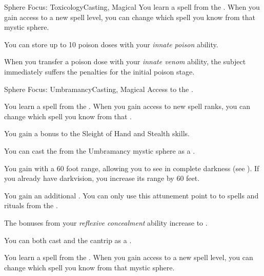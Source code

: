 \begin{feat}{Sphere Focus: Toxicology}{Casting, Magical}
         You learn a spell from the  .
        When you gain access to a new spell level, you can change which spell you know from that mystic sphere.

         You can store up to 10 poison doses with your \textit{innate poison} ability.

         When you transfer a poison dose with your \textit{innate venom} ability, the subject immediately suffers the penalties for the initial poison stage.
    \end{feat}

    \begin{feat}{Sphere Focus: Umbramancy}{Casting, Magical}
        \featpre Access to the  .

         You learn a spell from the  .
        When you gain access to new spell ranks, you can change which spell you know from that .

         You gain a  bonus to the Sleight of Hand and Stealth skills.

         You can cast the   from the Umbramancy mystic sphere as a .

         You gain  with a 60 foot range, allowing you to see in complete darkness (see ).
        If you already have darkvision, you increase its range by 60 feet.

         You gain an additional .
        You can only use this attunement point to  to spells and rituals from the  .

         The bonuses from your \textit{reflexive concealment} ability increase to .

         You can both cast and  the  cantrip as a .

         You learn a spell from the  .
        When you gain access to a new spell level, you can change which spell you know from that mystic sphere.


\end{feat}
